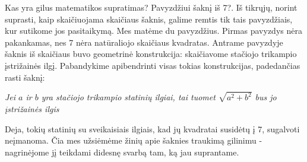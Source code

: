 \documentclass{article}
\begin{document}
\begin{mybox}{Kas yra gilus matematikos supratimas?}
 Pavyzdžiui šaknį iš 7?. Iš tikrųjų, norint suprasti, kaip skaičiuojama skaičiaus šaknis, galime remtis tik tais pavyzdžiais, kur sutikome jos pasitaikymą. Mes matėme du pavyzdžius. Pirmas pavyzdys nėra pakankamas, nes 7 nėra natūraliojo skaičiaus kvadratas. Antrame pavyzdyje šaknis iš skaičiaus buvo geometrinė konstrukcija: skaičiavome stačiojo trikampio įstrižainės ilgį. Pabandykime apibendrinti visas tokias konstrukcijas, padedančias rasti šaknį:

\textit{Jei $a$ ir $b$ yra stačiojo trikampio statinių ilgiai, tai tuomet $\sqrt{a^2+b^2}$ bus jo įstrižainės ilgis}

Deja, tokių statinių su sveikaisiais ilgiais, kad jų kvadratai susidėtų į 7, sugalvoti neįmanoma. Čia mes užsiėmėme žinių apie šaknies traukimą gilinimu - nagrinėjome jį teikdami didesnę svarbą tam, ką jau suprantame. 
\end{mybox}
\end{document}
